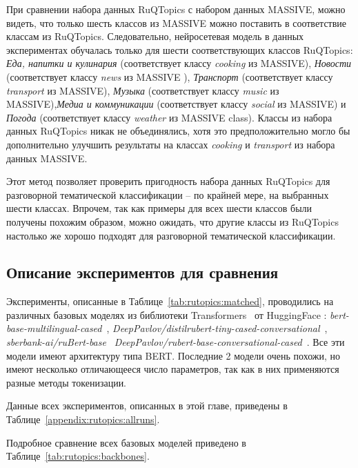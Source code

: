 При сравнении набора данных {RuQTopics} с набором данных {MASSIVE}, можно видеть, что только шесть классов из {MASSIVE} можно поставить в соответствие классам из  {RuQTopics}. Следовательно, нейросетевая модель в данных экспериментах обучалась только для шести соответствующих классов {RuQTopics}: \textit{Еда, напитки и кулинария} (соответствует классу \textit{cooking} из {MASSIVE}), \textit{Новости} (соответствует классу \textit{news} из {MASSIVE} ), \textit{Транспорт} (соответствует классу \textit{transport} из {MASSIVE}), \textit{Музыка} (соответствует классу \textit{music} из {MASSIVE}),\textit{Медиа и коммуникации} (соответствует классу \textit{social} из {MASSIVE}) и \textit{Погода} (соответствует классу \textit{weather} из {MASSIVE} class). Классы из набора данных {RuQTopics} никак не объединялись, хотя это предположительно могло бы дополнительно улучшить результаты на классах \textit{cooking} и \textit{transport} из набора данных {MASSIVE}.

Этот метод позволяет проверить пригодность набора данных {RuQTopics} для разговорной тематической классификации -- по крайней мере, на выбранных шести классах. Впрочем, так как примеры для всех шести классов были получены похожим образом, можно ожидать, что другие классы из {RuQTopics} настолько же хорошо подходят для разговорной тематической классификации.

\subsection{Описание экспериментов для сравнения}
Эксперименты, описанные в Таблице~\ref{tab:rutopics:matched}, проводились на различных базовых моделях из библиотеки {Transformers}~\cite{huggingface_transformers} от HuggingFace : \textit{bert-base-multilingual-cased}~\cite{multilingual_bert}, \textit{DeepPavlov/distilrubert-tiny-cased-conversational}~\cite{distilrubert}, \textit{sberbank-ai/ruBert-base}~\cite{sbert_base}  \textit{DeepPavlov/rubert-base-conversational-cased}~\cite{rubert}. Все эти модели имеют архитектуру типа BERT. Последние 2 модели очень похожи, но имеют несколько отличающееся число параметров, так как в них применяются разные методы токенизации.

Данные всех экспериментов, описанных в этой главе, приведены в Таблице~\ref{appendix:rutopics:allruns}. 

Подробное сравнение всех базовых моделей приведено в Таблице~\ref{tab:rutopics:backbones}.

